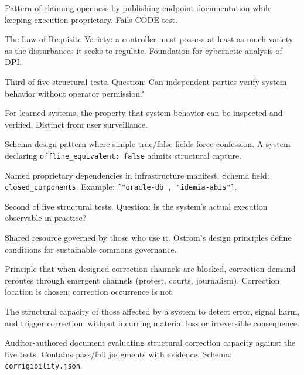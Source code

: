 \documentclass[11pt,a4paper]{article}
\begin{document}
\begin{description}[style=nextline, leftmargin=2cm]

\item[API-as-Openness] Pattern of claiming openness by publishing endpoint documentation while keeping execution proprietary. Fails CODE test.

\item[Ashby's Law] The Law of Requisite Variety: a controller must possess at least as much variety as the disturbances it seeks to regulate. Foundation for cybernetic analysis of DPI.

\item[AUDIT] Third of five structural tests. Question: Can independent parties verify system behavior without operator permission?

\item[Behavior Observability] For learned systems, the property that system behavior can be inspected and verified. Distinct from user surveillance.

\item[Boolean Trap] Schema design pattern where simple true/false fields force confession. A system declaring \texttt{offline\_equivalent: false} admits structural capture.

\item[Closed Components] Named proprietary dependencies in infrastructure manifest. Schema field: \texttt{closed\_components}. Example: \texttt{["oracle-db", "idemia-abis"]}.

\item[CODE] Second of five structural tests. Question: Is the system's actual execution observable in practice?

\item[Commons] Shared resource governed by those who use it. Ostrom's design principles define conditions for sustainable commons governance.

\item[Conservation of Correction Demand] Principle that when designed correction channels are blocked, correction demand reroutes through emergent channels (protest, courts, journalism). Correction location is chosen; correction occurrence is not.

\item[Corrigibility] The structural capacity of those affected by a system to detect error, signal harm, and trigger correction, without incurring material loss or irreversible consequence.

\item[Corrigibility Assessment] Auditor-authored document evaluating structural correction capacity against the five tests. Contains pass/fail judgments with evidence. Schema: \texttt{corrigibility.json}.


\end{description}
\end{document}
